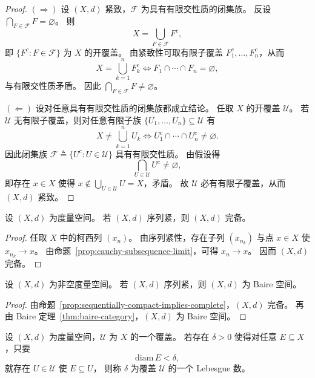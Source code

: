 \documentclass[lang=cn,a4paper,newtx,section]{elegantbook}
\begin{document}
\begin{proof}
  $(\Rightarrow)$ 设 $(X,d)$ 紧致，$\mathcal{F}$ 为具有有限交性质的闭集族。
  反设 $\bigcap_{F\in\mathcal{F}}F=\varnothing$。
  则
  \[
    X=\bigcup_{F\in\mathcal{F}}F^c,
  \]
  即 $\{F^c:F\in\mathcal{F}\}$ 为 $X$ 的开覆盖。
  由紧致性可取有限子覆盖 $F_1^c,\dots,F_n^c$，从而
  \[
    X=\bigcup_{k=1}^{n}F_k^c\iff F_1\cap\cdots\cap F_n=\varnothing,
  \]
  与有限交性质矛盾。
  因此 $\bigcap_{F\in\mathcal{F}}F\ne\varnothing$。

  $(\Leftarrow)$ 设对任意具有有限交性质的闭集族都成立结论。
  任取 $X$ 的开覆盖 $\mathcal{U}$。
  若 $\mathcal{U}$ 无有限子覆盖，则对任意有限子族 $\{U_1,\dots,U_n\}\subseteq\mathcal{U}$ 有
  \[
    X\ne\bigcup_{k=1}^{n}U_k\iff U_1^c\cap\cdots\cap U_n^c\ne\varnothing.
  \]
  因此闭集族 $\mathcal{F}\triangleq\{U^c:U\in\mathcal{U}\}$ 具有有限交性质。
  由假设得
  \[
    \bigcap_{U\in\mathcal{U}}U^c\ne\varnothing,
  \]
  即存在 $x\in X$ 使得 $x\notin\bigcup_{U\in\mathcal{U}}U=X$，矛盾。
  故 $\mathcal{U}$ 必有有限子覆盖，从而 $(X,d)$ 紧致。
\end{proof}

\begin{proposition}\label{prop:sequentially-compact-implies-complete}
  设 $(X,d)$ 为度量空间。
  若 $(X,d)$ 序列紧，则 $(X,d)$ 完备。
\end{proposition}

\begin{proof}
  任取 $X$ 中的柯西列 $(x_n)$。
  由序列紧性，存在子列 $(x_{n_k})$ 与点 $x\in X$ 使 $x_{n_k}\to x$。
  由命题~\ref{prop:cauchy-subsequence-limit}，可得 $x_n\to x$。
  因而 $(X,d)$ 完备。
\end{proof}

\begin{corollary}
  设 $(X,d)$ 为非空度量空间。
  若 $(X,d)$ 序列紧，则 $(X,d)$ 为 Baire 空间。
\end{corollary}

\begin{proof}
  由命题~\ref{prop:sequentially-compact-implies-complete}，$(X,d)$ 完备。
  再由 Baire 定理~\ref{thm:baire-category}，$(X,d)$ 为 Baire 空间。
\end{proof}

\begin{definition}
  设 $(X,d)$ 为度量空间，$\mathcal{U}$ 为 $X$ 的一个覆盖。
  若存在 $\delta>0$ 使得对任意 $E\subseteq X$，只要
  \[
    \mathrm{diam}\,E<\delta,
  \]
  就存在 $U\in\mathcal{U}$ 使 $E\subseteq U$，
  则称 $\delta$ 为覆盖 $\mathcal{U}$ 的一个 Lebesgue 数。
\end{definition}
\end{document}
